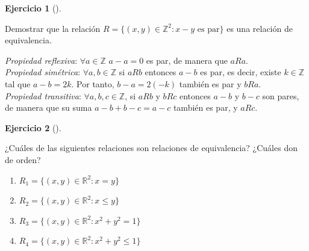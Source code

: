 \documentclass[
  a4paper,
]{scrreport}
\providecommand{\tightlist}{%
  \setlength{\itemsep}{0pt}\setlength{\parskip}{0pt}}\usepackage{longtable,booktabs,array}
\theoremstyle{definition}
\newtheorem{exercise}{Ejercicio}[chapter]
\theoremstyle{remark}
\begin{document}
\begin{exercise}[]\protect\hypertarget{exr-relacion-equivalencia-1}{}\label{exr-relacion-equivalencia-1}

Demostrar que la relación
\(R=\{(x,y)\in \mathbb{Z}^2: x-y \mbox{ es par}\}\) es una relación de
equivalencia.

\end{exercise}

\begin{tcolorbox}[enhanced jigsaw, left=2mm, coltitle=black, colbacktitle=quarto-callout-tip-color!10!white, opacitybacktitle=0.6, colback=white, breakable, titlerule=0mm, toptitle=1mm, rightrule=.15mm, bottomtitle=1mm, bottomrule=.15mm, toprule=.15mm, leftrule=.75mm, arc=.35mm, opacityback=0, title=\textcolor{quarto-callout-tip-color}{\faLightbulb}\hspace{0.5em}{Solución}, colframe=quarto-callout-tip-color-frame]

\emph{Propiedad reflexiva}: \(\forall a\in\mathbb{Z}\) \(a-a=0\) es par,
de manera que \(aRa\).\\
\emph{Propiedad simétrica}: \(\forall a,b\in\mathbb{Z}\) si \(aRb\)
entonces \(a-b\) es par, es decir, existe \(k\in \mathbb{Z}\) tal que
\(a-b=2k\). Por tanto, \(b-a=2(-k)\) también es par y \(bRa\).\\
\emph{Propiedad transitiva}: \(\forall a,b,c\in\mathbb{Z}\), si \(aRb\)
y \(bRc\) entonces \(a-b\) y \(b-c\) son pares, de manera que su suma
\(a-b+b-c = a-c\) también es par, y \(aRc\).

\end{tcolorbox}

\begin{exercise}[]\protect\hypertarget{exr-relaciones-equivalencia}{}\label{exr-relaciones-equivalencia}

¿Cuáles de las siguientes relaciones son relaciones de equivalencia?
¿Cuáles don de orden?

\begin{enumerate}
\def\labelenumi{\alph{enumi}.}
\tightlist
\item
  \(R_1=\{(x,y)\in \mathbb{R}^2: x = y\}\)
\item
  \(R_2=\{(x,y)\in \mathbb{R}^2: x\leq y\}\)
\item
  \(R_3=\{(x,y)\in \mathbb{R}^2: x^2 + y^2 = 1\}\)
\item
  \(R_4=\{(x,y)\in \mathbb{R}^2: x^2 + y^2 \leq 1\}\)
\end{enumerate}

\end{exercise}
\end{document}
